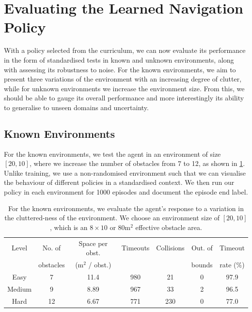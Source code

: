 \section{Evaluating the Learned Navigation Policy}
\label{sec:7_evaluating_policy}

With a policy selected from the curriculum, we can now evaluate its performance in the form of standardised tests in known and unknown environments, along with assessing its robustness to noise.
For the known environments, we aim to present three variations of the environment with an increasing degree of clutter, while for unknown environments we increase the environment size.
From this, we should be able to gauge its overall performance and more interestingly its ability to generalise to unseen domains and uncertainty.

\subsection{Known Environments}
For the known environments, we test the agent in an environment of size $[20, 10]$, where we increase the number of obstacles from 7 to 12, as shown in \cref{tab:7_known_tests}. Unlike training, we use a non-randomised environment such that we can visualise the behaviour of different policies in a standardised context. We then run our policy in each environment for 1000 episodes and document the episode end label.
\begin{table}[htb]
    \centering
    \begin{tabular}{||c|c|c|c|c|c|c||}
    \hline
    Level & No. of & Space per obst. & Timeouts & Collisions & Out. of & Timeout \\  
     & obstacles & (m$^2$ / obst.) & & & bounds & rate (\%) \\\hline\hline
    Easy    & 7  & 11.4   & 980 & 21 & 0 &  97.9 \\\hline
    Medium  & 9  & 8.89   & 967 & 33 & 2 &  96.5 \\\hline
    Hard    & 12  & 6.67  & 771 & 230 & 0 & 77.0 \\\hline
    \end{tabular}
    \caption{For the known environments, we evaluate the agent's response to a variation in the cluttered-ness of the environment. We choose an environment size of $[20, 10]$, which is an $8\times 10$ or 80m$^2$ effective obstacle area.}
    \label{tab:7_known_tests}
\end{table}


